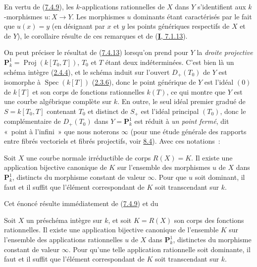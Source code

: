 En vertu de (\hyperref[II.7.4.9-fr]{7.4.9}), les $k$-applications rationnelles
de $X$ dans $Y$ s'identifient aux $k$-morphismes $u:X\to Y$. Les morphismes
$u$ dominants étant caractérisés par le fait que $u(x)=y$ (en désignant par
$x$ et $y$ les points génériques respectifs de $X$ et de $Y$), le corollaire
résulte de ces remarques et de (\hyperref[I.7.1.13-fr]{\textbf{I}, 7.1.13}).

\begin{env}[7.4.14]
\label{II.7.4.14-fr}
On peut préciser le résultat de (\hyperref[II.7.4.13-fr]{7.4.13}) lorsqu'on
prend pour $Y$ la \emph{droite projective}
$\mathbf{P}_k^1=\operatorname{Proj}(k[T_0,T])$, $T_0$ et $T$ étant deux
indéterminées. C'est bien là un schéma intègre
(\hyperref[II.2.4.4-fr]{2.4.4}), et le schéma induit sur l'ouvert $D_+(T_0)$
de $Y$ est isomorphe à $\operatorname{Spec}(k[T])$
(\hyperref[II.2.3.6-fr]{2.3.6}), donc le point générique de $Y$ est l'idéal
$(0)$ de $k[T]$ et son corps de fonctions rationnelles $k(T)$, ce qui montre
que $Y$ est une courbe algébrique complète sur $k$. En outre, le seul idéal
premier gradué de $S=k[T_0,T]$ contenant $T_0$ et distinct de $S_+$ est
l'idéal principal $(T_0)$, donc le complémentaire de $D_+(T_0)$ dans
$Y=\mathbf{P}_k^1$ est réduit à \emph{un point fermé}, dit «~point à
l'infini~» que nous noterons $\infty$ (pour une étude générale des rapports
entre fibrés vectoriels et fibrés projectifs, voir
\hyperref[subsection:II.8.4-fr]{8.4}). Avec ces notations~:
\end{env}

\begin{corollary}[7.4.15]
\label{II.7.4.15-fr}
Soit $X$ une courbe \textup{normale} irréductible de corps $R(X)=K$. Il existe une
application bijective canonique de $K$ sur l'ensemble des morphismes $u$ de
$X$ dans $\mathbf{P}_k^1$, distincts du morphisme constant de valeur
$\infty$. Pour que $u$ soit dominant, il faut et il suffit que l'élément
correspondant de $K$ soit transcendant sur $k$.
\end{corollary}

Cet énoncé résulte immédiatement de (\hyperref[II.7.4.9-fr]{7.4.9}) et du

\begin{lemma}[7.4.15.1]
\label{II.7.4.15.1-fr}
Soit $X$ un préschéma intègre sur $k$, et soit $K=R(X)$ son corps des fonctions
rationnelles. Il existe une application bijective canonique de l'ensemble
$K$ sur l'ensemble des applications rationnelles $u$ de $X$ dans
$\mathbf{P}_k^1$, distinctes du morphisme constant de valeur $\infty$. Pour
qu'une telle application rationnelle soit dominante, il faut et il suffit que
l'élément correspondant de $K$ soit transcendant sur $k$.
\end{lemma}

